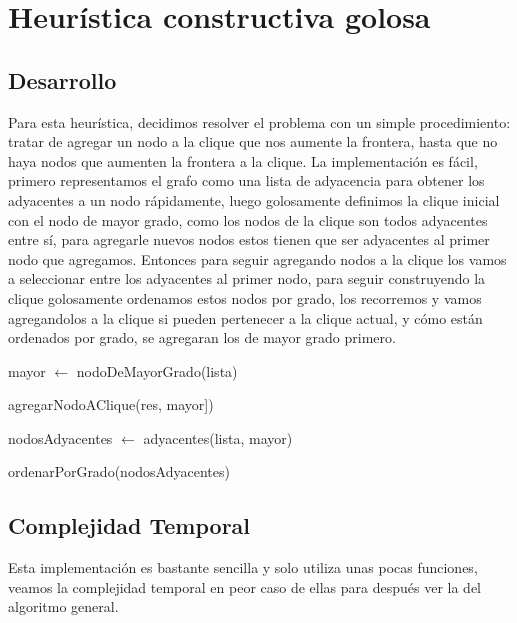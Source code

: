 \section{Heurística constructiva golosa}
\subsection{Desarrollo}
Para esta heurística, decidimos resolver el problema con un simple procedimiento: tratar de agregar un nodo a la clique que nos aumente la frontera, hasta que no haya nodos que aumenten la frontera a la clique.
La implementación es fácil, primero representamos el grafo como una lista de adyacencia para obtener los adyacentes a un nodo rápidamente, luego golosamente definimos la clique inicial con el nodo de mayor grado, como los nodos de la clique son todos adyacentes entre sí, para agregarle nuevos nodos estos tienen que ser adyacentes al primer nodo que agregamos. Entonces para seguir agregando nodos a la clique los vamos a seleccionar entre los adyacentes al primer nodo, para seguir construyendo la clique golosamente ordenamos estos nodos por grado, los recorremos y vamos agregandolos a la clique si pueden pertenecer a la clique actual, y cómo están ordenados por grado, se agregaran los de mayor grado primero.


\begin{algorithm}[H]
	\NoCaptionOfAlgo
	\caption{}

    mayor $\leftarrow$ nodoDeMayorGrado(lista)

    agregarNodoAClique(res, mayor])

    nodosAdyacentes $\leftarrow$ adyacentes(lista, mayor)

    ordenarPorGrado(nodosAdyacentes)

\end{algorithm}

\subsection{Complejidad Temporal}

Esta implementación es bastante sencilla y solo utiliza unas pocas funciones, veamos la complejidad temporal en peor caso de ellas para después ver la del algoritmo general.

